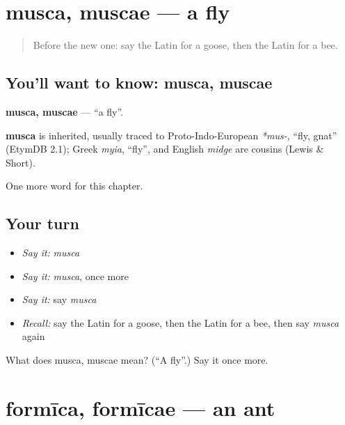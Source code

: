 \section[musca, muscae]{musca, muscae — a fly}

\label{lesson:LA-C132-musca}



\begin{quote}
Before the new one: say the Latin for a goose, then the Latin for a bee.
\end{quote}

\subsection*{You'll want to know: musca, muscae}
\textbf{musca, muscae} — \textquotedblleft{}a fly\textquotedblright{}.

\begin{cousinweb}
\textbf{musca} is inherited, usually traced to Proto-Indo-European \emph{*mus-}, \textquotedblleft{}fly, gnat\textquotedblright{} (EtymDB 2.1); Greek \emph{myia}, \textquotedblleft{}fly\textquotedblright{}, and English \emph{midge} are cousins (Lewis \& Short).
\end{cousinweb}

\begin{grammarlens}[title={What you've built}]
One more word for this chapter.
\end{grammarlens}

\subsection*{Your turn}
\begin{itemize}
\raggedright
  \item \emph{Say it:} \emph{musca}
  \item \emph{Say it:} \emph{musca}, once more
  \item \emph{Say it:} say \emph{musca}
  \item \emph{Recall:} say the Latin for a goose, then the Latin for a bee, then say \emph{musca} again
\end{itemize}

\begin{tcolorbox}[breakable,colback=teal!4,colframe=teal!35!black,title={Before you move on}]
What does musca, muscae mean? (\textquotedblleft{}A fly\textquotedblright{}.) Say it once more.
\end{tcolorbox}
\section[formīca, formīcae]{formīca, formīcae — an ant}

